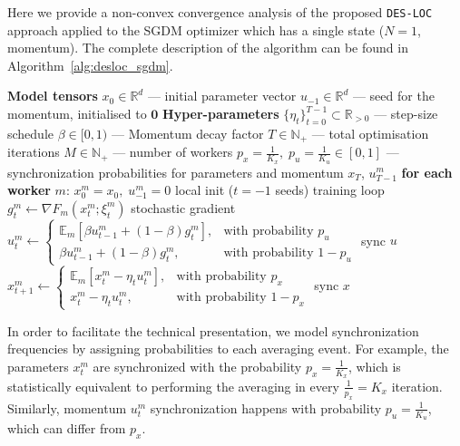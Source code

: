 Here we provide a non-convex convergence analysis of the proposed \texttt{DES-LOC} approach applied to the SGDM optimizer which has a single state ($N=1$, momentum). The complete description of the algorithm can be found in Algorithm~\ref{alg:desloc_sgdm}.

\begin{algorithm}[ht]
\caption{\texttt{DES-LOC-SGDM}}
\label{alg:desloc_sgdm}
\begin{algorithmic}[1]
\REQUIRE \textbf{Model tensors}
\STATE $x_0 \in \mathbb{R}^d$ --- initial parameter vector
\STATE $u_{-1} \in \mathbb{R}^d$ --- seed for the momentum, initialised to $\mathbf{0}$
\REQUIRE \textbf{Hyper-parameters}
\STATE $\{\eta_t\}_{t=0}^{T-1} \subset \mathbb{R}_{>0}$ --- step-size schedule
\STATE $\beta \in [0,1)$ --- Momentum decay factor
\STATE $T \in \mathbb{N}_+$ --- total optimisation iterations
\STATE $M \in \mathbb{N}_+$ --- number of workers
\STATE $p_x = \frac{1}{K_x},\; p_u = \frac{1}{K_u} \in [0,1]$ --- synchronization probabilities for parameters and momentum
\ENSURE $x_T$, $u_{T-1}^m$
\STATE \textbf{for each worker} $m$: $x_0^m = x_0,\; u_{-1}^m = 0$ \hfill local init ($t=-1$ seeds)
 \hfill training loop
        \STATE $g_t^m \leftarrow \nabla F_m(x_t^m; \xi_t^m)$ \hfill stochastic gradient
        \STATE $u_t^m \leftarrow \begin{cases} \mathbb{E}_m[\beta u_{t-1}^m + (1-\beta) g_t^m], & \text{with probability } p_u \\ \beta u_{t-1}^m + (1-\beta) g_t^m, & \text{with probability } 1-p_u \end{cases}$ \hfill sync $u$
        \STATE $x_{t+1}^m \leftarrow \begin{cases} \mathbb{E}_m[x_t^m - \eta_t u_t^m], & \text{with probability } p_x \\ x_t^m - \eta_t u_t^m, & \text{with probability } 1-p_x \end{cases}$ \hfill sync $x$
    \ENDFOR
\ENDFOR
\end{algorithmic}
\end{algorithm}

In order to facilitate the technical presentation, we model synchronization frequencies by assigning probabilities to each averaging event. For example, the parameters $x_t^m$ are synchronized with the probability $p_x = \frac{1}{K_x}$, which is statistically equivalent to performing the averaging in every $\frac{1}{p_x} = K_x$ iteration. Similarly, momentum $u_t^m$ synchronization happens with probability $p_u = \frac{1}{K_u}$, which can differ from $p_x$.

